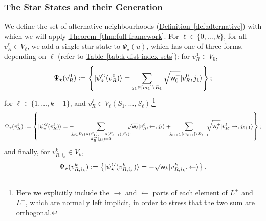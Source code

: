 \documentclass{theoretics}
\newcommand{\thm}[1]{\hyperref[thm:#1]{Theorem~\ref*{thm:#1}}}
\newcommand{\tabl}[1]{\hyperref[tab:#1]{Table~\ref*{tab:#1}}}
\newcommand{\defin}[1]{\hyperref[def:#1]{Definition~\ref*{def:#1}}}
\def\ket#1{{\lvert}#1\rangle}
\renewcommand{\>}{\rangle}
\newcommand{\<}{\langle}
\renewcommand{\(}{\left(}
\renewcommand{\)}{\right)}
\def\w{{\sf w}}
\begin{document}
\subsubsection{The Star States and their Generation}\label{sec:k-dist-star-states}

We define the set of alternative neighbourhoods (\defin{alternative}) with which we will apply \thm{full-framework}. 
For $\ell\in\{0,\dots,k\}$, for all  $v^{\ell}_R \in V_\ell$, we add a single star state to $\Psi_\star(u)$, which has one of three forms, depending on $\ell$ (refer to \tabl{k-dist-index-sets}): for $v^0_R\in V_0$,
\begin{equation}
\Psi_\star(v^{0}_R):=\left\{\ket{\psi_\star^G(v^{0}_R)}=
\sum_{j_1\in [m_1]\setminus R_1}\sqrt{\w_{0}^+}\ket{v^0_R,j_1}
\right\};\label{eq:k-star-v0}
\end{equation} 
for $\ell\in\{1,\dots,k-1\}$, and 
$v^{\ell}_R\in V_{\ell}(S_1,\dots,S_{\ell})$,\footnote{Here we explicitly include the $\rightarrow$ and $\leftarrow$ parts of each element of $L^+$ and $L^-$, which are normally left implicit, in order to stress that the two sum are orthogonal.}
\begin{equation}
\Psi_\star(v^{\ell}_R):=\left\{\ket{\psi_\star^G(v^{\ell}_R)}=-\!\!\!\!
\sum_{\substack{ j_{\ell}\in R_{\ell}(\mu(S_1),\dots,\mu(S_{\ell-1}),S_{\ell}):\\ d_R^{\rightarrow}(j_{\ell})=0}}\!\!\!\!\!\sqrt{\w_{\ell}}\ket{v^{\ell}_R,\leftarrow,j_{\ell}} 
+\!\!\!\sum_{j_{\ell+1}\in [m_{\ell+1}]\setminus R_{\ell+1}}\!\!\!
\sqrt{\w_{\ell}^+}\ket{v^{\ell}_R,\rightarrow,j_{\ell+1}}
\right\};\label{eq:k-star-v-ell}
\end{equation} 
and finally, for $v^k_{R,i_k}\in V_k$,
\begin{equation}
\Psi_\star(v^{k}_{R,i_k}):=\left\{\ket{\psi_\star^G(v^{k}_{R,i_k})}=
-\sqrt{\w_k}\ket{v^k_{R,i_k},\leftarrow}
\right\}.\label{eq:k-star-vk}
\end{equation} 
\end{document}
